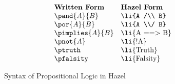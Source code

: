 \begin{figure}[ht]
\[\begin{array}{ll}
\textbf{Written Form} & \textbf{Hazel Form} \\
\pand{A}{B} & \text{\li{A /\\ B}} \\ 
\por{A}{B} & \text{\li{A \\/ B}} \\ 
\pimplies{A}{B} & \text{\li{A ==> B}} \\ 
\pnot{A} & \text{\li{!A}} \\ 
\ptruth & \text{\li{Truth}} \\ 
\pfalsity & \text{\li{Falsity}} \\ 
\end{array}\]
\vspace{-10px}
\caption{Syntax of Propositional Logic in Hazel}
\label{fig:logic-syntax}
\end{figure}









